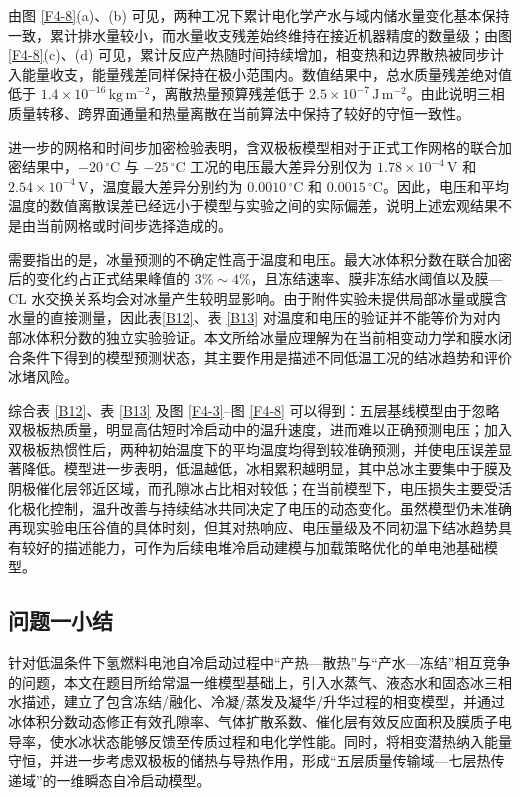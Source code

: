 \documentclass[bwprint]{gmcmthesis}
\numberwithin{figure}{section}
\begin{document}
由图 \ref{F4-8}(a)、(b) 可见，两种工况下累计电化学产水与域内储水量变化基本保持一致，累计排水量较小，而水量收支残差始终维持在接近机器精度的数量级；由图 \ref{F4-8}(c)、(d) 可见，累计反应产热随时间持续增加，相变热和边界散热被同步计入能量收支，能量残差同样保持在极小范围内。数值结果中，总水质量残差绝对值低于 \(1.4\times10^{-16}\,\mathrm{kg\,m^{-2}}\)，离散热量预算残差低于 \(2.5\times10^{-7}\,\mathrm{J\,m^{-2}}\)。由此说明三相质量转移、跨界面通量和热量离散在当前算法中保持了较好的守恒一致性。

进一步的网格和时间步加密检验表明，含双极板模型相对于正式工作网格的联合加密结果中，\(-20\,^\circ\mathrm C\) 与 \(-25\,^\circ\mathrm C\) 工况的电压最大差异分别仅为 \(1.78\times10^{-4}\,\mathrm V\) 和 \(2.54\times10^{-4}\,\mathrm V\)，温度最大差异分别约为 \(0.0010\,^\circ\mathrm C\) 和 \(0.0015\,^\circ\mathrm C\)。因此，电压和平均温度的数值离散误差已经远小于模型与实验之间的实际偏差，说明上述宏观结果不是由当前网格或时间步选择造成的。

需要指出的是，冰量预测的不确定性高于温度和电压。最大冰体积分数在联合加密后的变化约占正式结果峰值的 \(3\%\sim4\%\)，且冻结速率、膜非冻结水阈值以及膜—CL 水交换关系均会对冰量产生较明显影响。由于附件实验未提供局部冰量或膜含水量的直接测量，因此表\ref{B12}、表 \ref{B13} 对温度和电压的验证并不能等价为对内部冰体积分数的独立实验验证。本文所给冰量应理解为在当前相变动力学和膜水闭合条件下得到的模型预测状态，其主要作用是描述不同低温工况的结冰趋势和评价冰堵风险。

综合表 \ref{B12}、表 \ref{B13} 及图 \ref{F4-3}--图 \ref{F4-8} 可以得到：五层基线模型由于忽略双极板热质量，明显高估短时冷启动中的温升速度，进而难以正确预测电压；加入双极板热惯性后，两种初始温度下的平均温度均得到较准确预测，并使电压误差显著降低。模型进一步表明，低温越低，冰相累积越明显，其中总冰主要集中于膜及阴极催化层邻近区域，而孔隙冰占比相对较低；在当前模型下，电压损失主要受活化极化控制，温升改善与持续结冰共同决定了电压的动态变化。虽然模型仍未准确再现实验电压谷值的具体时刻，但其对热响应、电压量级及不同初温下结冰趋势具有较好的描述能力，可作为后续电堆冷启动建模与加载策略优化的单电池基础模型。
\subsection{问题一小结}
针对低温条件下氢燃料电池自冷启动过程中“产热—散热”与“产水—冻结”相互竞争的问题，本文在题目所给常温一维模型基础上，引入水蒸气、液态水和固态冰三相水描述，建立了包含冻结/融化、冷凝/蒸发及凝华/升华过程的相变模型，并通过冰体积分数动态修正有效孔隙率、气体扩散系数、催化层有效反应面积及膜质子电导率，使水冰状态能够反馈至传质过程和电化学性能。同时，将相变潜热纳入能量守恒，并进一步考虑双极板的储热与导热作用，形成“五层质量传输域—七层热传递域”的一维瞬态自冷启动模型。
\end{document}
